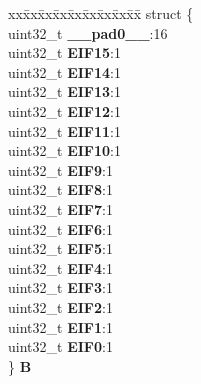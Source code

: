 \begin{DoxyCompactItemize}
\begin{tabbing}
\end{tabbing}\item 
\mbox{\label{unionSIU__tag_1_1SIU__EISR__tag_ada9bfb6f7a9617c30113fc47694a802a}} 
\begin{tabbing}
xx\=xx\=xx\=xx\=xx\=xx\=xx\=xx\=xx\=\kill
struct \{\\
\>uint32\_t {\bfseries \_\_pad0\_\_}:16\\
\>uint32\_t {\bfseries EIF15}:1\\
\>uint32\_t {\bfseries EIF14}:1\\
\>uint32\_t {\bfseries EIF13}:1\\
\>uint32\_t {\bfseries EIF12}:1\\
\>uint32\_t {\bfseries EIF11}:1\\
\>uint32\_t {\bfseries EIF10}:1\\
\>uint32\_t {\bfseries EIF9}:1\\
\>uint32\_t {\bfseries EIF8}:1\\
\>uint32\_t {\bfseries EIF7}:1\\
\>uint32\_t {\bfseries EIF6}:1\\
\>uint32\_t {\bfseries EIF5}:1\\
\>uint32\_t {\bfseries EIF4}:1\\
\>uint32\_t {\bfseries EIF3}:1\\
\>uint32\_t {\bfseries EIF2}:1\\
\>uint32\_t {\bfseries EIF1}:1\\
\>uint32\_t {\bfseries EIF0}:1\\
\} {\bfseries B}\\


\end{tabbing}
\end{DoxyCompactItemize}
